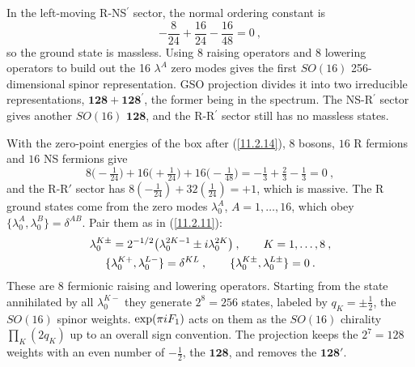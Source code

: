 In the left-moving R-NS$^{\prime}$ sector, the normal ordering constant is
\begin{equation}
	-\frac{8}{24} + \frac{16}{24} - \frac{16}{48} =0 \:, \label{11.2.24}
\end{equation}
so the ground state is massless. Using 8 raising operators and 8 lowering operators to build out the 16 $\lambda^{A}$ zero modes gives the first $SO(16)$ 256-dimensional spinor representation. GSO projection divides it into two irreducible representations, $\mathbf{128}+\mathbf{128}^{\prime}$, the former being in the spectrum. The NS-R$^{\prime}$ sector gives another $SO(16)$ $\mathbf{128}$, and the R-R$^{\prime}$ sector still has no massless states.
\begin{tcolorbox}[breakable]
	\begin{remark}
		With the zero-point energies of the box after (\ref{11.2.14}), $8$ bosons, $16$ R fermions and $16$ NS fermions give
		\begin{equation*}
			8\bigl(-\tfrac{1}{24}\bigr)+16\bigl(+\tfrac{1}{24}\bigr)+16\bigl(-\tfrac{1}{48}\bigr)=-\tfrac{1}{3}+\tfrac{2}{3}-\tfrac{1}{3}=0\:,
		\end{equation*}
		and the R-R$'$ sector has $8(-\frac{1}{24})+32(\frac{1}{24})=+1$, which is massive. The R ground states come from the zero modes $\lambda^{A}_{0}$, $A=1,\dots,16$, which obey $\{\lambda_{0}^{A},\lambda_{0}^{B}\}=\delta^{AB}$. Pair them as in (\ref{11.2.11}):
		\begin{gather*}
			\lambda_{0}^{K\pm}=2^{-1/2}\bigl(\lambda_{0}^{2K-1}\pm i\lambda_{0}^{2K}\bigr)\:,\qquad K=1,\dots,8\:,\\
			\{\lambda_{0}^{K+},\lambda_{0}^{L-}\}=\delta^{KL}\:,\qquad \{\lambda_{0}^{K\pm},\lambda_{0}^{L\pm}\}=0\:.
		\end{gather*}
		These are 8 fermionic raising and lowering operators. Starting from the state annihilated by all $\lambda_{0}^{K-}$ they generate $2^{8}=256$ states, labeled by $q_{K}=\pm\frac{1}{2}$, the $SO(16)$ spinor weights. $\exp(\pi i F_{1})$ acts on them as the $SO(16)$ chirality $\prod_{K}(2q_{K})$ up to an overall sign convention. The projection keeps the $2^{7}=128$ weights with an even number of $-\frac{1}{2}$, the $\mathbf{128}$, and removes the $\mathbf{128}'$.
	\end{remark}
\end{tcolorbox}

